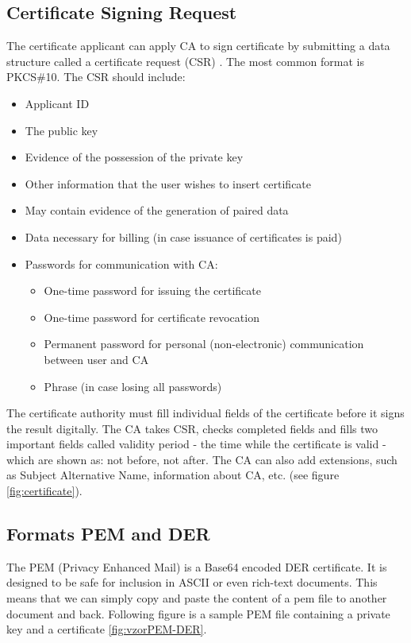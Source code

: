 \documentclass[
  twoside, 12pt, 
  printed, %
  notable,   %
  lof,     %
  lot,     %
]{fithesis3}
\begin{document}
\subsection{Certificate Signing Request}
The certificate applicant can apply CA to sign certificate by submitting a data structure called a 
certificate request (CSR) \cite{dostalek2016velky}. The most common format is PKCS\#10. The CSR 
should include:
\begin{itemize}[leftmargin=2em,rightmargin=1em,itemsep=0.75\parskip,parsep=0em,topsep=0em,partopsep=0em]
\item Applicant ID
\item The public key
\item Evidence of the possession of the private key
\item Other information that the user wishes to insert certificate
\item May contain evidence of the generation of paired data
\item Data necessary for billing (in case issuance of certificates is paid)
\item Passwords for communication with CA:
  \begin{itemize}[leftmargin=2em,rightmargin=1em,itemsep=0.75\parskip,parsep=0em,topsep=0em,partopsep=0em]
  \item One-time password for issuing the certificate
  \item One-time password for certificate revocation
  \item Permanent password for personal (non-electronic) communication between user and CA
  \item Phrase (in case losing all passwords) 
  \end{itemize}
\end{itemize} 

The certificate authority must fill individual fields of the certificate before it signs the 
result digitally. The CA takes CSR, checks completed fields and fills two important fields called validity period - the time while the certificate is valid - which are shown as: not before, not after. The CA can also add extensions, such as Subject Alternative Name, information 
about CA, etc. (see figure \ref{fig:certificate}).

\subsection{Formats PEM and DER}
The PEM (Privacy Enhanced Mail) is a Base64 encoded DER certificate. It is designed 
to be safe for inclusion in ASCII or even rich-text documents. This means that we can simply copy 
and paste the content of a pem file to another document and back. Following figure is a sample 
PEM file containing a private key and a certificate \ref{fig:vzorPEM-DER}.
\end{document}
